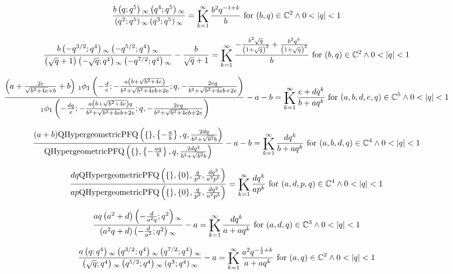 \documentclass{article}
\newcommand{\bigK}{\mathop{\raisebox{-5pt}{\huge K}}}
\begin{document}
\[\frac{b \left(q;q^5\right){}_{\infty } \left(q^4;q^5\right){}_{\infty }}{\left(q^2;q^5\right){}_{\infty } \left(q^3;q^5\right){}_{\infty }}=\bigK_{k=1}^{\infty}\frac{b^2 q^{-1+k}}{b}\text{ for }(b,q)\in \mathbb{C}^2\land 0<\left| q\right| <1\] 

\[\frac{b \left(-q^{3/2};q^4\right){}_{\infty } \left(-q^{5/2};q^4\right){}_{\infty }}{\left(\sqrt{q}+1\right) \left(-\sqrt{q};q^4\right){}_{\infty } \left(-q^{7/2};q^4\right){}_{\infty }}-\frac{b}{\sqrt{q}+1}=\bigK_{k=1}^{\infty}\frac{-\frac{b^2 \sqrt{q}}{\left(1+\sqrt{q}\right)^2}+\frac{b^2 q^k}{\left(1+\sqrt{q}\right)^2}}{b}\text{ for }(b,q)\in \mathbb{C}^2\land 0<\left| q\right| <1\] 

\[\frac{\left(a+\frac{2 e}{\sqrt{b^2+4 e}+b}+b\right) \, _1\phi _1\left(-\frac{d}{e};-\frac{a \left(b+\sqrt{b^2+4 e}\right)}{b^2+\sqrt{b^2+4 e} b+2 e};q,-\frac{2 e q}{b^2+\sqrt{b^2+4 e} b+2 e}\right)}{\, _1\phi _1\left(-\frac{d q}{e};-\frac{a \left(b+\sqrt{b^2+4 e}\right) q}{b^2+\sqrt{b^2+4 e} b+2 e};q,-\frac{2 e q}{b^2+\sqrt{b^2+4 e} b+2 e}\right)}-a-b=\bigK_{k=1}^{\infty}\frac{e+d q^k}{b+a q^k}\text{ for }(a,b,d,e,q)\in \mathbb{C}^5\land 0<\left| q\right| <1\] 

\[\frac{(a+b) \text{QHypergeometricPFQ}\left(\{\},\left\{-\frac{a}{b}\right\},q,\frac{2 d q}{b^2+\sqrt{b^2} b}\right)}{\text{QHypergeometricPFQ}\left(\{\},\left\{-\frac{a q}{b}\right\},q,\frac{2 d q^2}{b^2+\sqrt{b^2} b}\right)}-a-b=\bigK_{k=1}^{\infty}\frac{d q^k}{b+a q^k}\text{ for }(a,b,d,q)\in \mathbb{C}^4\land 0<\left| q\right| <1\] 

\[\frac{d q \text{QHypergeometricPFQ}\left(\{\},\{0\},\frac{q}{p^2},\frac{d q^3}{a^2 p^5}\right)}{a p \text{QHypergeometricPFQ}\left(\{\},\{0\},\frac{q}{p^2},\frac{d q^2}{a^2 p^3}\right)}=\bigK_{k=1}^{\infty}\frac{d q^k}{a p^k}\text{ for }(a,d,p,q)\in \mathbb{C}^4\land 0<\left| q\right| <1\] 

\[\frac{a q \left(a^2+d\right) \left(-\frac{d}{a^2 q};q^2\right){}_{\infty }}{\left(a^2 q+d\right) \left(-\frac{d}{a^2};q^2\right){}_{\infty }}-a=\bigK_{k=1}^{\infty}\frac{d q^k}{a+a q^k}\text{ for }(a,d,q)\in \mathbb{C}^3\land 0<\left| q\right| <1\] 

\[\frac{a \left(q;q^4\right){}_{\infty } \left(q^{3/2};q^4\right){}_{\infty } \left(q^{7/2};q^4\right){}_{\infty }}{\left(\sqrt{q};q^4\right){}_{\infty } \left(q^{5/2};q^4\right){}_{\infty } \left(q^3;q^4\right){}_{\infty }}-a=\bigK_{k=1}^{\infty}\frac{a^2 q^{-\frac{1}{2}+k}}{a+a q^k}\text{ for }(a,q)\in \mathbb{C}^2\land 0<\left| q\right| <1\] 
\end{document}
